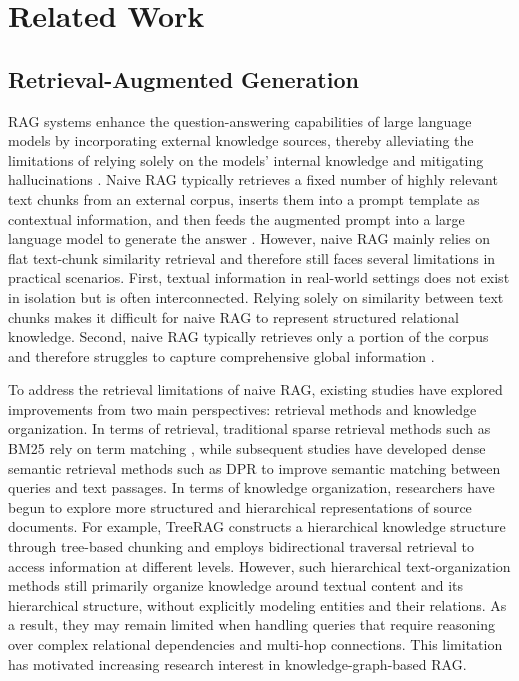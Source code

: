 \documentclass[preprint,12pt,authoryear]{elsarticle}
\begin{document}

\section{Related Work}
\label{sec:related-work}


\subsection{Retrieval-Augmented Generation}
\label{subsec:rag}
RAG systems enhance the question-answering capabilities of large language models by incorporating external knowledge sources, thereby alleviating the limitations of relying solely on the models' internal knowledge and mitigating hallucinations \citep{chan2024rqrag,fan2024survey}. Naive RAG typically retrieves a fixed number of highly relevant text chunks from an external corpus, inserts them into a prompt template as contextual information, and then feeds the augmented prompt into a large language model to generate the answer \citep{yu2024rankrag}.
However, naive RAG mainly relies on flat text-chunk similarity retrieval and therefore still faces several limitations in practical scenarios. First, textual information in real-world settings does not exist in isolation but is often interconnected. Relying solely on similarity between text chunks makes it difficult for naive RAG to represent structured relational knowledge. Second, naive RAG typically retrieves only a portion of the corpus and therefore struggles to capture comprehensive global information \citep{edge2024graphrag}.

To address the retrieval limitations of naive RAG, existing studies have explored improvements from two main perspectives: retrieval methods and knowledge organization. In terms of retrieval, traditional sparse retrieval methods such as BM25 rely on term matching \citep{robertson2009bm25}, while subsequent studies have developed dense semantic retrieval methods such as DPR \citep{karpukhin2020dpr} to improve semantic matching between queries and text passages. In terms of knowledge organization, researchers have begun to explore more structured and hierarchical representations of source documents. For example, TreeRAG \citep{tao2025treerag} constructs a hierarchical knowledge structure through tree-based chunking and employs bidirectional traversal retrieval to access information at different levels. However, such hierarchical text-organization methods still primarily organize knowledge around textual content and its hierarchical structure, without explicitly modeling entities and their relations. As a result, they may remain limited when handling queries that require reasoning over complex relational dependencies and multi-hop connections. This limitation has motivated increasing research interest in knowledge-graph-based RAG.
\end{document}
